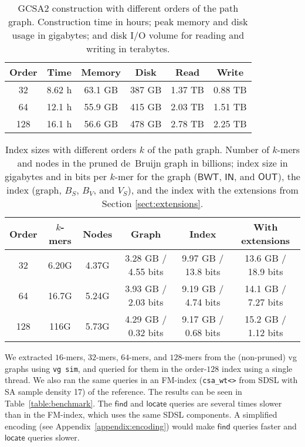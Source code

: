 \documentclass[a4paper,11pt]{llncs}
\newcommand{\find}{\ensuremath{\mathsf{find}}}
\newcommand{\locate}{\ensuremath{\mathsf{locate}}}
\newcommand{\kmer}[1]{$#1$\nobreakdash-mer}
\newcommand{\orderk}[1]{order\nobreakdash-$#1$}
\newcommand{\BWT}{\ensuremath{\mathsf{BWT}}}
\newcommand{\bvIN}{\ensuremath{\mathsf{IN}}}
\newcommand{\bvOUT}{\ensuremath{\mathsf{OUT}}}
\begin{document}
\begin{table}[t!]
\begin{center}
\caption{GCSA2 construction with different orders of the path graph. Construction time in hours; peak memory and disk usage in gigabytes; and disk I/O volume for reading and writing in terabytes.}\label{table:construction}
\begin{tabular}{c|ccc|cc}
\hline
\textbf{Order} & \textbf{Time} & \textbf{Memory} & \textbf{Disk} & \textbf{Read} & \textbf{Write} \\
\hline
 32 & 8.62 h & 63.1 GB & 387 GB & 1.37 TB & 0.88 TB \\
 64 & 12.1 h & 55.9 GB & 415 GB & 2.03 TB & 1.51 TB \\
128 & 16.1 h & 56.6 GB & 478 GB & 2.78 TB & 2.25 TB \\
\hline
\end{tabular}
\end{center}
\end{table}

\begin{table}[t!]
\begin{center}
\caption{Index sizes with different orders $k$ of the path graph. Number of \kmer{k}s and nodes in the pruned de~Bruijn graph in billions; index size in gigabytes and in bits per \kmer{k} for the graph ($\BWT$, $\bvIN$, and $\bvOUT$), the index (graph, $B_{S}$, $B_{V}$, and $V_{S}$), and the index with the extensions from Section \ref{sect:extensions}.}\label{table:indexes}
\begin{tabular}{c|cc|c|c|c}
\hline
\textbf{Order} & \textbf{\kmer{k}s} & \textbf{Nodes} & \textbf{Graph} & \textbf{Index} & \textbf{With extensions} \\
\hline
 32 & 6.20G & 4.37G & 3.28 GB / 4.55 bits & 9.97 GB / 13.8 bits & 13.6 GB / 18.9 bits \\
 64 & 16.7G & 5.24G & 3.93 GB / 2.03 bits & 9.19 GB / 4.74 bits & 14.1 GB / 7.27 bits \\
128 &  116G & 5.73G & 4.29 GB / 0.32 bits & 9.17 GB / 0.68 bits & 15.2 GB / 1.12 bits \\
\hline
\end{tabular}
\end{center}
\end{table}

We extracted \kmer{16}s, \kmer{32}s, \kmer{64}s, and \kmer{128}s from the (non-pruned) vg graphs using \texttt{vg sim}, and queried for them in the \orderk{128} index using a single thread. We also ran the same queries in an FM\nobreakdash-index (\texttt{csa\_wt<>} from SDSL with SA sample density 17) of the reference. The results can be seen in Table~\ref{table:benchmark}. The $\find$ and $\locate$ queries are several times slower than in the FM\nobreakdash-index, which uses the same SDSL components. A simplified encoding (see Appendix~\ref{appendix:encoding}) would make $\find$ queries faster and $\locate$ queries slower.
\end{document}

